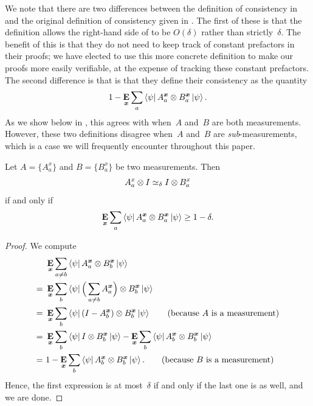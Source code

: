 We note that there are two differences between the definition of consistency in 
and the original definition of consistency given in \cite[Definition 4.11]{NW19}.
The first of these is that the~\cite{NW19} definition
allows the right-hand side of  to be $O(\delta)$
rather than strictly~$\delta$.
The benefit of this is that they do not need to keep track of constant prefactors in their proofs;
we have elected to use this more concrete definition
to make our proofs more easily verifiable, at the expense of tracking these constant prefactors.
The second difference is that is that they define their consistency as the quantity
\begin{equation*}
1 - \mathop{\bf E\/}_{{\boldsymbol{x}}} \sum_a \bra{\psi} A^{{\boldsymbol{x}}}_a \otimes B^{{\boldsymbol{x}}}_a \ket{\psi}.
\end{equation*}
As we show below in ,
this agrees with 
when~$A$ and~$B$ are both measurements.
However, these two definitions disagree
when~$A$ and~$B$ are \emph{sub}-measurements,
which is a case we will frequently encounter throughout this paper.

\begin{proposition}\label{prop:simeq-for-measurements}
Let $A = \{A^x_a\}$ and $B = \{B^x_a\}$ be two measurements.
Then
\begin{equation*}
A^x_a \otimes I \simeq_{\delta} I \otimes B^x_a
\end{equation*}
if and only if
\begin{equation*}
\mathop{\bf E\/}_{{\boldsymbol{x}}} \sum_a \bra{\psi} A^{{\boldsymbol{x}}}_a \otimes B^{{\boldsymbol{x}}}_a \ket{\psi} \geq 1 - \delta.
\end{equation*}
\end{proposition}
\begin{proof}
We compute
\begin{align*}
&\mathop{\bf E\/}_{{\boldsymbol{x}}} \sum_{a \neq b}\bra{\psi} A^{{\boldsymbol{x}}}_a \otimes B^{{\boldsymbol{x}}}_b \ket{\psi}\\
=~& \mathop{\bf E\/}_{{\boldsymbol{x}}} \sum_b \bra{\psi} \Big(\sum_{a \neq b} A^{{\boldsymbol{x}}}_a\Big) \otimes B^{{\boldsymbol{x}}}_b\ket{\psi}\\
=~&\mathop{\bf E\/}_{{\boldsymbol{x}}} \sum_b \bra{\psi} (I - A^{{\boldsymbol{x}}}_b) \otimes B^{{\boldsymbol{x}}}_b\ket{\psi}
	\tag{because~$A$ is a measurement}\\
=~&\mathop{\bf E\/}_{{\boldsymbol{x}}} \sum_b \bra{\psi} I \otimes B^{{\boldsymbol{x}}}_b\ket{\psi}
	- \mathop{\bf E\/}_{{\boldsymbol{x}}} \sum_b \bra{\psi} A^{{\boldsymbol{x}}}_b \otimes B^{{\boldsymbol{x}}}_b\ket{\psi}\\
=~&1
	- \mathop{\bf E\/}_{{\boldsymbol{x}}} \sum_b \bra{\psi} A^{{\boldsymbol{x}}}_b \otimes B^{{\boldsymbol{x}}}_b\ket{\psi}. \tag{because~$B$ is a measurement}
\end{align*}
Hence, the first expression is at most~$\delta$ if and only if the last one is as well,
and we are done.
\end{proof}

